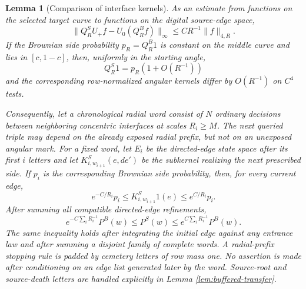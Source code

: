 \documentclass[12pt,reqno]{amsart}
\theoremstyle{plain}
\newtheorem{lemma}[theorem]{Lemma}
\theoremstyle{definition}
\theoremstyle{remark}
\numberwithin{equation}{section}
\begin{document}
\begin{lemma}[Comparison of interface kernels]
\label{lem:smooth-interface-discretization}
As an estimate from functions on the selected target curve to functions
on the digital source-edge space,
\begin{equation}
\|Q_R^SU_+f-U_0(Q_R^Bf)\|_\infty
       \le CR^{-1}\|f\|_{4,R}.\label{eq:ct-smooth-39b}
\end{equation}
If the Brownian side probability $p_R=Q_R^B1$ is constant on the
middle curve and lies in $[c,1-c]$, then, uniformly in the starting
angle,
\begin{equation}
Q_R^S1=p_R(1+O(R^{-1}))\label{eq:ct-smooth-39c}
\end{equation}
and the corresponding row-normalized angular kernels differ by
$O(R^{-1})$ on $C^4$ tests.

Consequently, let a chronological radial word consist of $N$
ordinary decisions between neighboring concentric interfaces at
scales $R_i\ge M$.  The next queried triple may depend on the already
exposed radial prefix, but not on an unexposed angular mark.  For a fixed
word, let $E_i$ be the directed-edge state space after its first $i$
letters and let $K^S_{i,w_{i+1}}(e,de')$ be the subkernel realizing the
next prescribed side.  If $p_i$ is the corresponding Brownian side
probability, then, for every current edge,
\begin{equation}
e^{-C/R_i}p_i\le K^S_{i,w_{i+1}}1(e)
          \le e^{C/R_i}p_i .\label{eq:ct-smooth-39cprime}
\end{equation}
After summing all compatible directed-edge refinements,
\begin{equation}
e^{-C\sum_iR_i^{-1}}P^B(w)
 \le P^S(w)\le
 e^{C\sum_iR_i^{-1}}P^B(w).\label{eq:ct-smooth-39d}
\end{equation}
The same inequality holds after integrating the initial edge against any
entrance law and after summing a disjoint family of complete words.  A
radial-prefix stopping rule is padded by cemetery letters of row mass one.
No assertion is made after conditioning on an edge list generated later by
the word.  Source-root and source-death letters are handled explicitly in
Lemma \ref{lem:buffered-transfer}.

\end{lemma}
\end{document}
